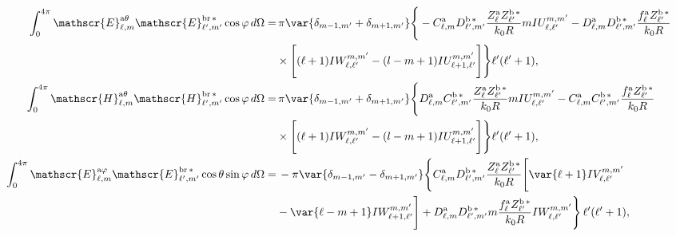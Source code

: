 \begin{align}
\int_{0}^{4\pi} \mathscr{E}_{\ell, m}^{\text{a}\theta}\mathscr{E}_{\ell^{\prime}, m^{\prime}}^{\text{br}\,*} \cos\varphi \, d\Omega =& 
%
\, \pi \var{ \delta_{m-1, m^{\prime}} + \delta_{m+1, m^{\prime}} } \Bigg\{-C_{\ell,m}^{\rm a}D_{\ell^{\prime}, m^{\prime}}^{\rm b \, *}\frac{Z_{\ell}^{\rm a}Z_{\ell^{\prime}}^{\rm b\, *}}{k_0 R} m IU_{\ell, \ell^{\prime}}^{m, m^{\prime}} 
%
-D_{\ell, m}^{\rm a}D_{\ell^{\prime}, m^{\prime}}^{\rm b \, *} \frac{f_{\ell}^{\rm a}Z_{\ell^{\prime}}^{\rm b \, *}}{k_0 R} \nonumber \\
%
& \times \Bigg[ (\ell+1) IW_{\ell, \ell^{\prime}}^{m, m^{\prime}} 
%
-(l-m+1) IU_{\ell + 1, \ell^{\prime}}^{m, m^{\prime}} \Bigg] \Bigg\}\ell^{\prime}(\ell^{\prime}+1),\\
%
%
\int_{0}^{4\pi} \mathscr{H}_{\ell, m}^{\text{a}\theta}\mathscr{H}_{\ell^{\prime}, m^{\prime}}^{\text{br}\,*} \cos\varphi \, d\Omega =& 
%
\, \pi \var{ \delta_{m-1, m^{\prime}} + \delta_{m+1, m^{\prime}} } \Bigg\{D_{\ell,m}^{\rm a}C_{\ell^{\prime}, m^{\prime}}^{\rm b \, *}\frac{Z_{\ell}^{\rm a}Z_{\ell^{\prime}}^{\rm b\, *}}{k_0 R} m IU_{\ell, \ell^{\prime}}^{m, m^{\prime}} 
%
-C_{\ell, m}^{\rm a}C_{\ell^{\prime}, m^{\prime}}^{\rm b \, *} \frac{f_{\ell}^{\rm a}Z_{\ell^{\prime}}^{\rm b \, *}}{k_0 R} \nonumber \\
%
& \times \Bigg[ (\ell+1) IW_{\ell, \ell^{\prime}}^{m, m^{\prime}} 
%
-(l-m+1) IU_{\ell + 1, \ell^{\prime}}^{m, m^{\prime}} \Bigg] \Bigg\}\ell^{\prime}(\ell^{\prime}+1),\\
%
%
%
%
\int_0^{4\pi}\mathscr{E}_{\ell, m}^{\text{a}\varphi}\mathscr{E}_{\ell^{\prime}, m^{\prime}}^{\text{br}\,*}\cos\theta\sin\varphi \, d\Omega
%
 =& \, - \pi \var{ \delta_{m-1, m^{\prime}} - \delta_{m+1, m^{\prime}} } \Bigg\{ C_{\ell, m}^{\rm a} D_{\ell^{\prime}, m^{\prime}}^{\rm b \, *} \frac{Z_{\ell}^{\rm a} Z_{\ell^{\prime}}^{\rm b \, *}}{k_0 R} \Bigg[\var{\ell +1} IV_{\ell, \ell^{\prime}}^{m, m^{\prime}} \nonumber \\
%
&-\var{\ell - m +1} IW_{\ell + 1, \ell^{\prime}}^{m, m^{\prime}} \Bigg]
%
 + D_{\ell, m}^{\rm a} D_{\ell^{\prime}, m^{\prime}}^{\rm b \, *} m \frac{f_{\ell}^{\rm a} Z_{\ell^{\prime}}^{\rm b\, *}}{k_0 R} IW_{\ell, \ell^{\prime}}^{m, m^{\prime}} \Bigg\} \, \ell^{\prime}(\ell^{\prime}+1),  
%
%
\end{align}
\vspace{-0.8cm}
